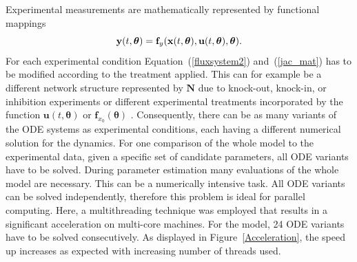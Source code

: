 \documentclass[12pt,a4paper]{scrartcl}
\begin{document}
Experimental measurements are mathematically represented by functional mappings
\begin{equation}
    {\bf y}(t,{\boldsymbol \theta}) = {\bf f}_y({\bf x}(t,{\boldsymbol \theta}),{\bf u}(t,{\boldsymbol 
\theta}),{\boldsymbol \theta}). \label{eq:obs}
\end{equation}
For each experimental condition Equation~(\ref{fluxsystem2}) and~(\ref{jac_mat}) has to 
be modified according to the treatment applied. This can for example be a different 
network structure represented by $\mathbf{N}$ due to knock-out, knock-in, or inhibition 
experiments or different experimental treatments incorporated by the function $\mathbf{u}
(t, \boldsymbol{\theta})$ or $\mathbf{f}_{x_0}(\boldsymbol{\theta})$ . Consequently, there 
can be as many variants of the ODE systems as experimental conditions, each having a 
different numerical solution for the dynamics. For one comparison of the whole model to 
the experimental data, given a specific set of candidate parameters, all ODE variants have 
to be solved. During parameter estimation many evaluations of the whole model are 
necessary. This can be a numerically intensive task. All ODE variants can be solved 
independently, therefore this problem is ideal for parallel computing. Here, a multithreading 
technique was employed that results in a significant acceleration on multi-core machines. 
For the \citet{Bachmann:2011fk} model, 24 ODE variants have to be solved consecutively. 
As displayed in Figure~\ref{Acceleration}, the speed up increases as expected with 
increasing number of threads used.
\end{document}
